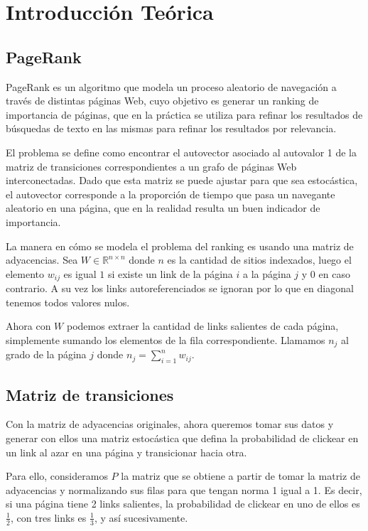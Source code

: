 \section{Introducción Teórica}

\subsection{PageRank}

PageRank es un algoritmo que modela un proceso aleatorio de navegación a través de
distintas páginas Web, cuyo objetivo es generar un ranking de importancia de páginas,
que en la práctica se utiliza para refinar los resultados de búsquedas de texto en las mismas
para refinar los resultados por relevancia.

El problema se define como encontrar el autovector asociado al autovalor 1 de la matriz de transiciones
correspondientes a un grafo de páginas Web interconectadas. Dado que esta matriz se puede ajustar
para que sea estocástica, el autovector corresponde a la proporción de tiempo que pasa un navegante
aleatorio en una página, que en la realidad resulta un buen indicador de importancia.

La manera en cómo se modela el problema del ranking es usando una matriz de adyacencias.
Sea $W \in \mathbb{R}^{n \times n}$ donde $n$ es la cantidad de sitios indexados, luego el elemento
$w_{ij}$ es igual $1$ si existe un link de la página $i$ a la página $j$ y $0$ en caso
contrario. A su vez los links autoreferenciados se ignoran por lo que en diagonal tenemos todos valores nulos.

Ahora con $W$ podemos extraer la cantidad de links salientes de cada página,
simplemente sumando los elementos de la fila correspondiente. Llamamos $n_j$
al grado de la página $j$ donde $n_j = \sum^{n}_{i = 1} w_{ij}$.

\subsection{Matriz de transiciones}

Con la matriz de adyacencias originales, ahora queremos tomar sus datos y generar con ellos
una matriz estocástica que defina la probabilidad de clickear en un link al azar
en una página y transicionar hacia otra.

Para ello, consideramos $P$ la matriz que se obtiene a partir de tomar la matriz de
adyacencias y normalizando sus filas para que tengan norma 1 igual a 1. Es decir,
si una página tiene 2 links salientes, la probabilidad de clickear en uno de ellos
es $\frac{1}{2}$, con tres links es $\frac{1}{3}$, y así sucesivamente.

